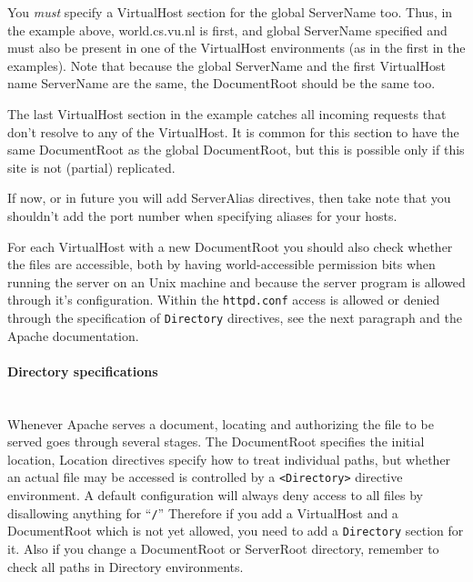 \documentclass[10pt,a4paper]{article}
\makeatletter
\newenvironment{p}{\@open{P}{}}{\@close{P}}
\newenvironment{p}{}{\par}
\makeatother
\begin{document}
\begin{p}
You \emph{must} specify a VirtualHost section for the global ServerName too.
Thus, in the example above, world.cs.vu.nl is first, and global ServerName
specified and must also be present in one of the VirtualHost environments (as
in the first in the examples).
Note that because the global ServerName and the first VirtualHost name
ServerName are the same, the DocumentRoot should be the same too.
\end{p}

\begin{p}
The last VirtualHost section in the example catches all incoming requests that
don't resolve to any of the VirtualHost.  It is common for this section to
have the same DocumentRoot as the global DocumentRoot, but this is possible
only if this site is not (partial) replicated.
\end{p}

\begin{p}
If now, or in future you will add ServerAlias directives, then take note that
you shouldn't add the port number when specifying aliases for your hosts.
\end{p}

\begin{p}
For each VirtualHost with a new DocumentRoot you should also check whether the
files are accessible, both by having world-accessible permission bits when
running the server on an Unix machine and because the server program is
allowed through it's configuration.  Within the \verb!httpd.conf! access is
allowed or denied through the specification of \texttt{Directory} directives,
see the next paragraph and the Apache documentation.
\end{p}

\paragraph{\textbf{Directory} specifications}~\\

\begin{p}
Whenever Apache serves a document, locating and authorizing the file to be
served goes through several stages.  The DocumentRoot specifies the initial
location, Location directives specify how to treat individual paths, but
whether an actual file may be accessed is controlled by a
\texttt{<Directory>} directive environment.  A default configuration will
always deny access to all files by disallowing anything for ``\texttt{/}''
Therefore if you add a VirtualHost and a DocumentRoot which is not yet allowed,
you need to add a \texttt{Directory} section for it.  Also if you change a
DocumentRoot or ServerRoot directory, remember to check all paths in Directory
environments.
\end{p}
\end{document}
